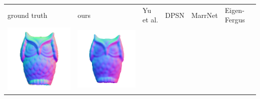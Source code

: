 \begin{tabularx}{\linewidth}{@{}Y@{}Y@{}Y@{}Y@{}Y@{}Y@{}}
ground truth & ours & Yu et al. & DPSN & MarrNet & Eigen-Fergus \\
\includegraphics[width=\linewidth]{semisynthetic/20150514_15_gt.png} &
\includegraphics[width=\linewidth]{semisynthetic/20150514_15_ours_out.png} &

\end{tabularx}
